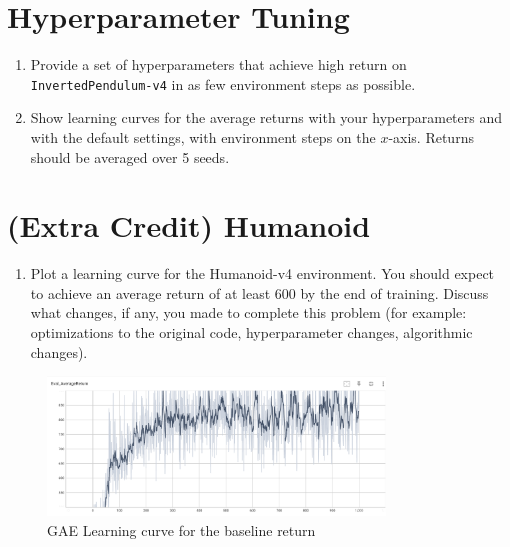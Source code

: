 \documentclass{article}
\begin{document}
\newpage\section{Hyperparameter Tuning}
\begin{enumerate}
    \item Provide a set of hyperparameters that achieve high return on \verb|InvertedPendulum-v4| in as few environment steps as possible.
    \item Show learning curves for the average returns with your hyperparameters and with the default settings, with environment steps on the $x$-axis. Returns should be averaged over 5 seeds.
\end{enumerate}



\newpage\section{(Extra Credit) Humanoid}
\begin{enumerate}
    \item Plot a learning curve for the Humanoid-v4 environment. You should expect to achieve an average return of at least 600 by the end of training. Discuss what changes, if any, you made to complete this problem (for example: optimizations to the original code, hyperparameter changes, algorithmic changes).
\end{enumerate}

\begin{figure}[H]
    \centering
    \includegraphics[width=0.8\textwidth]{img/Humanoid_Return.png}
    \caption{GAE Learning curve for the baseline return}
    \label{fig:Humanoid_return}
\end{figure}
\end{document}
